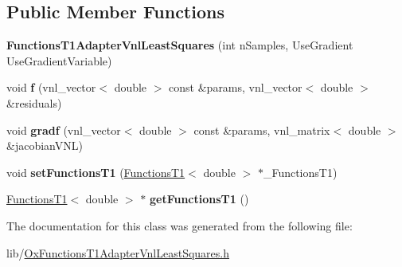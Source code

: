 \subsection*{Public Member Functions}
\begin{DoxyCompactItemize}
\item 
\hypertarget{class_ox_1_1_functions_t1_adapter_vnl_least_squares_a6f6511370037a627ee3862c95c339d74}{{\bfseries Functions\-T1\-Adapter\-Vnl\-Least\-Squares} (int n\-Samples, Use\-Gradient Use\-Gradient\-Variable)}\label{class_ox_1_1_functions_t1_adapter_vnl_least_squares_a6f6511370037a627ee3862c95c339d74}

\item 
\hypertarget{class_ox_1_1_functions_t1_adapter_vnl_least_squares_a9ccef57fbf5dbe160f8e2b520482613b}{void {\bfseries f} (vnl\-\_\-vector$<$ double $>$ const \&params, vnl\-\_\-vector$<$ double $>$ \&residuals)}\label{class_ox_1_1_functions_t1_adapter_vnl_least_squares_a9ccef57fbf5dbe160f8e2b520482613b}

\item 
\hypertarget{class_ox_1_1_functions_t1_adapter_vnl_least_squares_a9daa157011b1fdd91198ad5c5a765f09}{void {\bfseries gradf} (vnl\-\_\-vector$<$ double $>$ const \&params, vnl\-\_\-matrix$<$ double $>$ \&jacobian\-V\-N\-L)}\label{class_ox_1_1_functions_t1_adapter_vnl_least_squares_a9daa157011b1fdd91198ad5c5a765f09}

\item 
\hypertarget{class_ox_1_1_functions_t1_adapter_vnl_least_squares_aae77f00cf870a0c31c4d7830ee5a053a}{void {\bfseries set\-Functions\-T1} (\hyperlink{class_ox_1_1_functions_t1}{Functions\-T1}$<$ double $>$ $\ast$\-\_\-\-Functions\-T1)}\label{class_ox_1_1_functions_t1_adapter_vnl_least_squares_aae77f00cf870a0c31c4d7830ee5a053a}

\item 
\hypertarget{class_ox_1_1_functions_t1_adapter_vnl_least_squares_a67669d931b4bb96a60ead54b63a17e05}{\hyperlink{class_ox_1_1_functions_t1}{Functions\-T1}$<$ double $>$ $\ast$ {\bfseries get\-Functions\-T1} ()}\label{class_ox_1_1_functions_t1_adapter_vnl_least_squares_a67669d931b4bb96a60ead54b63a17e05}

\end{DoxyCompactItemize}


The documentation for this class was generated from the following file\-:\begin{DoxyCompactItemize}
\item 
lib/\hyperlink{_ox_functions_t1_adapter_vnl_least_squares_8h}{Ox\-Functions\-T1\-Adapter\-Vnl\-Least\-Squares.\-h}\end{DoxyCompactItemize}
